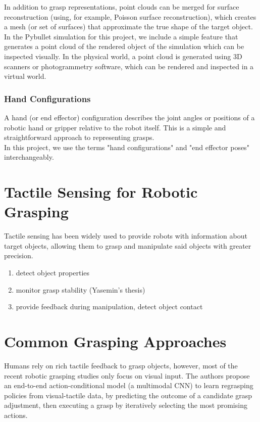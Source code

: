 \documentclass[11pt, a4paper]{report}
\begin{document}
In addition to grasp representations, point clouds can be merged for surface reconstruction (using, for example, Poisson surface reconstruction), which creates a mesh (or set of surfaces) that approximate the true shape of the target object.\\

In the Pybullet simulation for this project, we include a simple feature that generates a point cloud of the rendered object of the simulation which can be inspected visually. In the physical world, a point cloud is generated using 3D scanners or photogrammetry software, which can be rendered and inspected in a virtual world.


\subsubsection{Hand Configurations}
\label{sec:2.1.1.3}
A hand (or end effector) configuration describes the joint angles or positions of a robotic hand or gripper relative to the robot itself. This is a simple and straightforward approach to representing grasps.\\

In this project, we use the terms "hand configurations" and "end effector poses" interchangeably.


\section{Tactile Sensing for Robotic Grasping}
\label{sec:2.2}
Tactile sensing has been widely used to provide robots with information about target objects, allowing them to grasp and manipulate said objects with greater precision.

\begin{enumerate}
    \item detect object properties
    \item monitor grasp stability (Yasemin's thesis)
    \item provide feedback during manipulation, detect object contact
\end{enumerate}


\section{Common Grasping Approaches}
\label{sec:2.3}
Humans rely on rich tactile feedback to grasp objects, however, most of the recent robotic grasping studies only focus on visual input. The authors propose an end-to-end action-conditional model (a multimodal CNN) to learn regrasping policies from visual-tactile data, by predicting the outcome of a candidate grasp adjustment, then executing a grasp by iteratively selecting the most promising actions\cite{Calandra_2018}.
\end{document}
